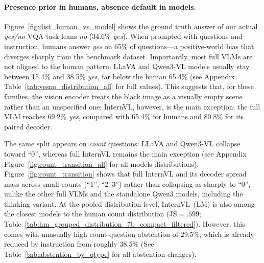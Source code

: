 \documentclass[letterpaper]{article}
\begin{document}
\paragraph{Presence prior in humans, absence default in models.}
Figure~\ref{fig:dist_human_vs_model} shows the ground truth answer of our actual \textit{yes/no} VQA task leans \textit{no} (34.6\% \textit{yes}). When prompted with questions and instruction, humans answer \textit{yes} on 65\% of questions---a positive-world bias that diverges sharply from the benchmark dataset.
Importantly, most full VLMs are not aligned to the human pattern: LLaVA and Qwen3-VL models usually stay between 15.4\% and 38.5\% \textit{yes}, far below the human 65.4\% (see Appendix Table~\ref{tab:yesno_distribution_all} for full values). This suggests that, for these families, the vision encoder treats the black image as a visually empty scene rather than an unspecified one; InternVL, however, is the main exception: the full VLM reaches 69.2\% \textit{yes}, compared with 65.4\% for humans and 80.8\% for its paired decoder. 

The same split appears on \textit{count} questions: LLaVA and Qwen3-VL collapse toward ``0'', whereas full InternVL remains the main exception (see Appendix Figure~\ref{fig:count_transition_all} for all models distributions). Figure~\ref{fig:count_transition} shows that full InternVL and its decoder spread mass across small counts (``1'', ``2--3'') rather than collapsing as sharply to ``0'', unlike the other full VLMs and the standalone Qwen3 models, including the thinking variant. At the pooled distribution level, InternVL~(LM) is also among the closest models to the human count distribution (JS$=.599$; Table~\ref{tab:hm_grouped_distribution_7b_compact_filtered}). However, this comes with unusually high count-question abstention of 29.5\%, which is already reduced by instruction from roughly 38.5\% (See Table~\ref{tab:abstention_by_qtype} for all abstention changes).
\end{document}
